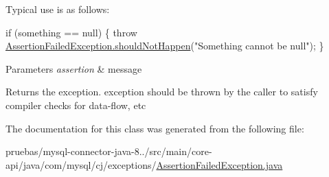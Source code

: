 Typical use is as follows\+:


\begin{DoxyPre}
if (something == null) \{
    throw \mbox{\hyperlink{classcom_1_1mysql_1_1cj_1_1exceptions_1_1_assertion_failed_exception_a357eac18cfa5a41a6fd49b3ee7af086c}{AssertionFailedException.shouldNotHappen}}("Something cannot be null");
\}
\end{DoxyPre}



\begin{DoxyParams}{Parameters}
{\em assertion} & message \\
\hline
\end{DoxyParams}
\begin{DoxyReturn}{Returns}
the exception. exception should be thrown by the caller to satisfy compiler checks for data-\/flow, etc 
\end{DoxyReturn}


The documentation for this class was generated from the following file\+:\begin{DoxyCompactItemize}
\item 
pruebas/mysql-\/connector-\/java-\/8../src/main/core-\/api/java/com/mysql/cj/exceptions/\mbox{\hyperlink{_assertion_failed_exception_8java}{Assertion\+Failed\+Exception.\+java}}\end{DoxyCompactItemize}
